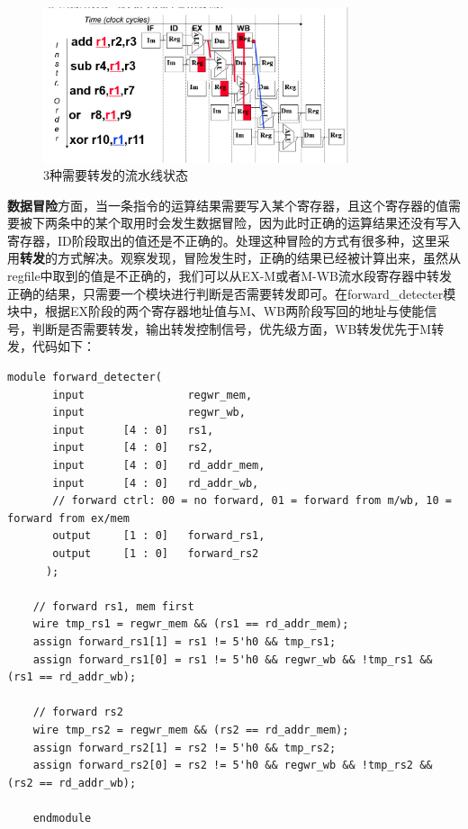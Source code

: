 \documentclass[]{article}
\begin{document}
  \begin{figure}[htb]
      \centering
      \includegraphics[width=0.8\textwidth]{forward.png}
      \caption{3种需要转发的流水线状态}
      \label{fig:forward}
  \end{figure}
  \textbf{数据冒险}方面，当一条指令的运算结果需要写入某个寄存器，且这个寄存器的值需要被下两条中的某个取用时会发生数据冒险，因为此时正确的运算结果还没有写入寄存器，ID阶段取出的值还是不正确的。处理这种冒险的方式有很多种，这里采用\textbf{转发}的方式解决。观察发现，冒险发生时，正确的结果已经被计算出来，虽然从regfile中取到的值是不正确的，我们可以从EX-M或者M-WB流水段寄存器中转发正确的结果，只需要一个模块进行判断是否需要转发即可。在forward\_detecter模块中，根据EX阶段的两个寄存器地址值与M、WB两阶段写回的地址与使能信号，判断是否需要转发，输出转发控制信号，优先级方面，WB转发优先于M转发，代码如下：
  \begin{lstlisting}[style={verilog-style}]
    module forward_detecter(
       input                regwr_mem,
       input                regwr_wb,
       input      [4 : 0]   rs1,
       input      [4 : 0]   rs2,
       input      [4 : 0]   rd_addr_mem,
       input      [4 : 0]   rd_addr_wb,
       // forward ctrl: 00 = no forward, 01 = forward from m/wb, 10 = forward from ex/mem
       output 	  [1 : 0]   forward_rs1,
       output     [1 : 0]   forward_rs2
      );
    
    // forward rs1, mem first
    wire tmp_rs1 = regwr_mem && (rs1 == rd_addr_mem);
    assign forward_rs1[1] = rs1 != 5'h0 && tmp_rs1;
    assign forward_rs1[0] = rs1 != 5'h0 && regwr_wb && !tmp_rs1 && (rs1 == rd_addr_wb);
    
    // forward rs2
    wire tmp_rs2 = regwr_mem && (rs2 == rd_addr_mem);
    assign forward_rs2[1] = rs2 != 5'h0 && tmp_rs2;
    assign forward_rs2[0] = rs2 != 5'h0 && regwr_wb && !tmp_rs2 && (rs2 == rd_addr_wb);
    
    endmodule
  \end{lstlisting}  
\end{document}
